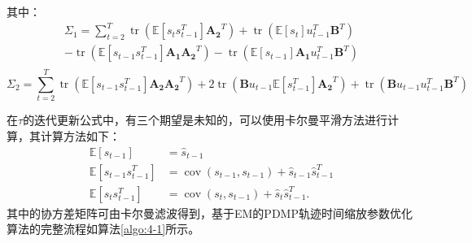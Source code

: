 其中：
\begin{equation}
    \begin{gathered}
    \Sigma_1  = \sum_{t=2}^T \operatorname{tr}\left(\mathbb{E}\left[s_ts_{t-1}^T\right]\mathbf{A_2}^T\right) + \operatorname{tr}\left(\mathbb{E}\left[s_t\right]u_{t-1}^T\mathbf{B}^T\right) \\- \operatorname{tr}\left(\mathbb{E}\left[s_{t-1}s_{t-1}^T\right]\mathbf{A_1}\mathbf{A_2}^T\right) - \operatorname{tr}\left(\mathbb{E}\left[s_{t-1}\right]\mathbf{A_1}u_{t-1}^T\mathbf{B}^T\right) \\
    \end{gathered}
\end{equation}
\begin{equation}
    \Sigma_2  = \sum_{t=2}^T \operatorname{tr}\left(\mathbb{E}\left[s_{t-1}s_{t-1}^T\right]\mathbf{A_2}\mathbf{A_2}^T\right) + 2 \operatorname{tr}\left(\mathbf{B}u_{t-1}\mathbb{E}\left[s_{t-1}^T\right]\mathbf{A_2}^T\right) +\operatorname{tr}\left(\mathbf{B}u_{t-1}u_{t-1}^T\mathbf{B}^T\right)
\end{equation}

在$\tau$的迭代更新公式中，有三个期望是未知的，可以使用卡尔曼平滑方法进行计算\cite{bishopPatternRecognitionMachine2006}，其计算方法如下：
\begin{equation}
    \begin{aligned}
    \mathbb{E}\left[s_{t-1}\right] & =\hat{s}_{t-1} \\
    \mathbb{E}\left[s_{t-1} s_{t-1}^T\right] & =\operatorname{cov}\left(s_{t-1}, s_{t-1}\right)+\hat{s}_{t-1} \hat{s}_{t-1}^T \\
    \mathbb{E}\left[s_t s_{t-1}^T\right] & =\operatorname{cov}\left(s_t, s_{t-1}\right)+\hat{s}_t \hat{s}_{t-1}^T .
    \end{aligned}
\end{equation}
其中的协方差矩阵可由卡尔曼滤波得到，基于EM的PDMP轨迹时间缩放参数优化算法的完整流程如算法\ref{algo:4-1}所示。

